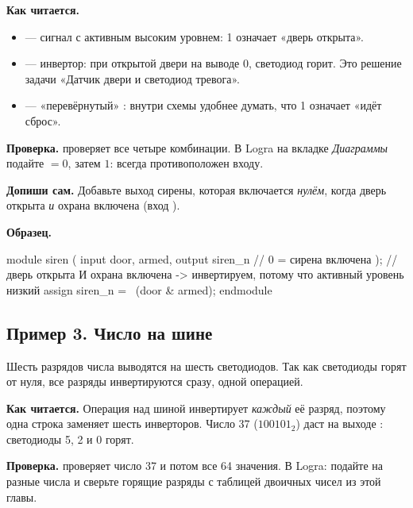
\textbf{Как читается.}
\begin{itemize}
  \item {} --- сигнал с активным высоким уровнем: 1 означает «дверь открыта».
  \item {} --- инвертор: при открытой двери на выводе 0, светодиод горит. Это решение задачи «Датчик двери и светодиод тревога».
  \item {} --- «перевёрнутый» : внутри схемы удобнее думать, что 1 означает «идёт сброс».
\end{itemize}
\textbf{Проверка.}  проверяет все четыре комбинации.
В Logra на вкладке \emph{Диаграммы} подайте  $=0$, затем $1$: 
всегда противоположен входу.

\textbf{Допиши сам.} Добавьте выход  сирены, которая включается
\emph{нулём}, когда дверь открыта \emph{и} охрана включена (вход ).

\textbf{Образец.}
\begin{vcode}
module siren (
    input  door, armed,
    output siren_n          // 0 = сирена включена
);
    // дверь открыта И охрана включена -> инвертируем, потому что активный уровень низкий
    assign siren_n = ~(door & armed);
endmodule
\end{vcode}

\subsection{Пример 3. Число на шине}

Шесть разрядов числа выводятся на шесть светодиодов. Так как светодиоды горят
от нуля, все разряды инвертируются сразу, одной операцией.


\textbf{Как читается.} Операция \code{\textasciitilde} над шиной инвертирует
\emph{каждый} её разряд, поэтому одна строка заменяет шесть инверторов. Число 37
($100101_2$) даст на выходе : светодиоды 5, 2 и 0 горят.

\textbf{Проверка.}  проверяет число 37 и потом все 64
значения. В Logra: подайте на  разные числа и сверьте горящие
разряды с таблицей двоичных чисел из этой главы.

